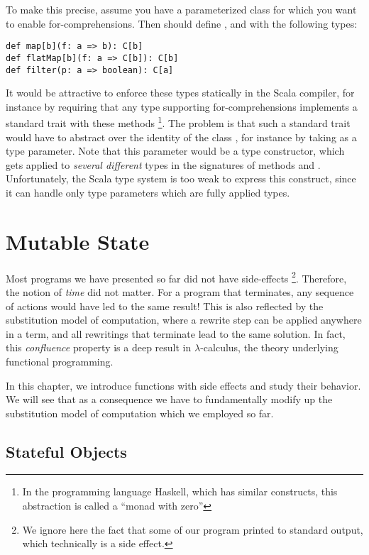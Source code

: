 {To make this precise, assume you have a parameterized class
  for which you want to enable for-comprehensions. Then
  should define ,  and 
 with the following types:
\begin{lstlisting}
def map[b](f: a => b): C[b]
def flatMap[b](f: a => C[b]): C[b]
def filter(p: a => boolean): C[a]
\end{lstlisting}
It would be attractive to enforce these types statically in the Scala
compiler, for instance by requiring that any type supporting
for-comprehensions implements a standard trait with these methods
\footnote{In the programming language Haskell, which has similar
constructs, this abstraction is called a ``monad with zero''}.  The
problem is that such a standard trait would have to abstract over the
identity of the class , for instance by taking  as a
type parameter.  Note that this parameter would be a type constructor,
which gets applied to {\em several different} types in the signatures of
methods  and . Unfortunately, the Scala type
system is too weak to express this construct, since it can handle only
type parameters which are fully applied types.

\chapter{Mutable State}

Most programs we have presented so far did not have side-effects
\footnote{We ignore here the fact that some of our program printed to
standard output, which technically is a side effect.}.  Therefore, the
notion of {\em time} did not matter.  For a program that terminates,
any sequence of actions would have led to the same result!  This is
also reflected by the substitution model of computation, where a
rewrite step can be applied anywhere in a term, and all rewritings
that terminate lead to the same solution.  In fact, this {\em
confluence} property is a deep result in $\lambda$-calculus, the
theory underlying functional programming. 

In this chapter, we introduce functions with side effects and study
their behavior. We will see that as a consequence we have to
fundamentally modify up the substitution model of computation which we
employed so far.

\section{Stateful Objects}

}

